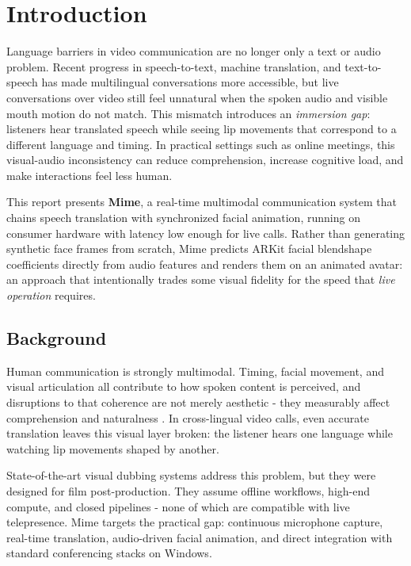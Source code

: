 \chapter{Introduction}

Language barriers in video communication are no longer only a text or audio problem. Recent progress in speech-to-text, machine translation, and text-to-speech has made multilingual conversations more accessible, but live conversations over video still feel unnatural when the spoken audio and visible mouth motion do not match. This mismatch introduces an \textit{immersion gap}: listeners hear translated speech while seeing lip movements that correspond to a different language and timing. In practical settings such as online meetings, this visual-audio inconsistency can reduce comprehension, increase cognitive load, and make interactions feel less human.

This report presents \textbf{Mime}, a real-time multimodal communication system that chains speech translation with synchronized facial animation, running on consumer hardware with latency low enough for live calls. Rather than generating synthetic face frames from scratch, Mime predicts ARKit facial blendshape coefficients directly from audio features and renders them on an animated avatar: an approach that intentionally trades some visual fidelity for the speed that \textit{live operation} requires.

\section{Background}

Human communication is strongly multimodal. Timing, facial movement, and visual articulation all contribute to how spoken content is perceived, and disruptions to that coherence are not merely aesthetic - they measurably affect comprehension and naturalness \cite{mcgurk1976}. In cross-lingual video calls, even accurate translation leaves this visual layer broken: the listener hears one language while watching lip movements shaped by another.

State-of-the-art visual dubbing systems address this problem, but they were designed for film post-production. They assume offline workflows, high-end compute, and closed pipelines - none of which are compatible with live telepresence. Mime targets the practical gap: continuous microphone capture, real-time translation, audio-driven facial animation, and direct integration with standard conferencing stacks on Windows.

